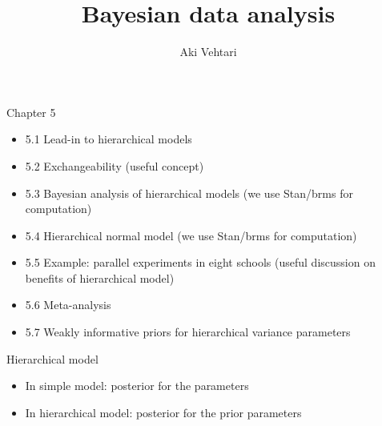 \documentclass[finnish,english,t]{beamer}
\title[]{Bayesian data analysis}
\subtitle{}
\author{Aki Vehtari}
\institute[Aalto]{}
\begin{document}
\begin{frame}{Chapter 5}

  \begin{itemize}
\item 5.1 Lead-in to hierarchical models
\item 5.2 Exchangeability (useful concept)
\item {\color{gray}5.3 Bayesian analysis of hierarchical models (we use Stan/brms for computation)}
\item {\color{gray}5.4 Hierarchical normal model (we use Stan/brms for computation)}
\item 5.5 Example: parallel experiments in eight schools (useful discussion on benefits of hierarchical model)
\item 5.6 Meta-analysis
\item 5.7 Weakly informative priors for hierarchical variance parameters
\end{itemize}
\end{frame}

\begin{frame}{Hierarchical model}

  \begin{itemize}
  \item In simple model: posterior for the parameters
  \item In hierarchical model: posterior for the prior parameters
  \end{itemize}

\end{frame}
\end{document}
